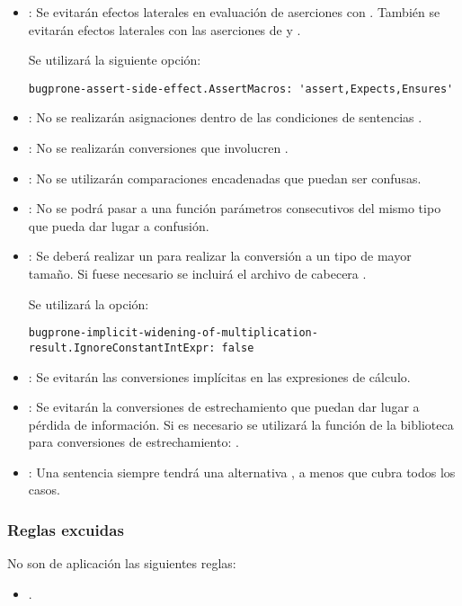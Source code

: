 \begin{itemize}

\item {}:
Se evitarán efectos laterales en evaluación de aserciones con .
También se evitarán efectos laterales con las aserciones de  
 y .

Se utilizará la siguiente opción:
\begin{lstlisting}
bugprone-assert-side-effect.AssertMacros: 'assert,Expects,Ensures'
\end{lstlisting}

\item {}:
No se realizarán asignaciones dentro de las condiciones de sentencias .

\item {}:
No se realizarán conversiones que involucren .

\item {}:
No se utilizarán comparaciones encadenadas que puedan ser confusas.

\item {}: 
No se podrá pasar a una función parámetros consecutivos del mismo tipo
que pueda dar lugar a confusión.

\item {}: 
Se deberá realizar un  para realizar la conversión a un
tipo de mayor tamaño. Si fuese necesario se incluirá el archivo de cabecera
.

Se utilizará la opción:
\begin{lstlisting}
bugprone-implicit-widening-of-multiplication-result.IgnoreConstantIntExpr: false
\end{lstlisting}

\item {}: 
Se evitarán las conversiones implícitas en las expresiones de cálculo.

\item {}:
Se evitarán la conversiones de estrechamiento que puedan dar lugar a pérdida
de información. Si es necesario se utilizará la función de la biblioteca
 para conversiones de estrechamiento:
.

\item {}:
Una sentencia  siempre tendrá una alternativa ,
a menos que cubra todos los casos.

\end{itemize}

\subsubsection{Reglas excuidas}

No son de aplicación las siguientes reglas:

\begin{itemize}

\item {}.

\end{itemize}
